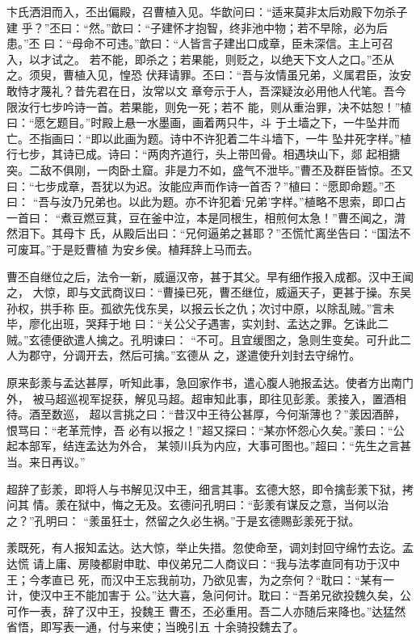 卞氏洒泪而入，丕出偏殿，召曹植入见。华歆问曰：“适来莫非太后劝殿下勿杀子建
乎？”丕曰：“然。”歆曰：“子建怀才抱智，终非池中物；若不早除，必为后患。”丕
曰：“母命不可违。”歆曰：“人皆言子建出口成章，臣未深信。主上可召入，以才试之。
若不能，即杀之；若果能，则贬之，以绝天下文人之口。”丕从之。须臾，曹植入见，惶恐
伏拜请罪。丕曰：“吾与汝情虽兄弟，义属君臣，汝安敢恃才蔑礼？昔先君在日，汝常以文
章夸示于人，吾深疑汝必用他人代笔。吾今限汝行七步吟诗一首。若果能，则免一死；若不
能，则从重治罪，决不姑恕！”植曰：“愿乞题目。”时殿上悬一水墨画，画着两只牛，斗
于土墙之下，一牛坠井而亡。丕指画曰：“即以此画为题。诗中不许犯着二牛斗墙下，一牛
坠井死字样。”植行七步，其诗已成。诗曰：“两肉齐道行，头上带凹骨。相遇块山下，郯
起相搪突。二敌不俱刚，一肉卧土窟。非是力不如，盛气不泄毕。”曹丕及群臣皆惊。丕又
曰：“七步成章，吾犹以为迟。汝能应声而作诗一首否？”植曰：“愿即命题。”丕曰：
“吾与汝乃兄弟也。以此为题。亦不许犯着‘兄弟’字样。”植略不思索，即口占一首曰：
“煮豆燃豆萁，豆在釜中泣，本是同根生，相煎何太急！”曹丕闻之，潸然泪下。其母卞
氏，从殿后出曰：“兄何逼弟之甚耶？”丕慌忙离坐告曰：“国法不可废耳。”于是贬曹植
为安乡侯。植拜辞上马而去。

曹丕自继位之后，法令一新，威逼汉帝，甚于其父。早有细作报入成都。汉中王闻之，
大惊，即与文武商议曰：“曹操已死，曹丕继位，威逼天子，更甚于操。东吴孙权，拱手称
臣。孤欲先伐东吴，以报云长之仇；次讨中原，以除乱贼。”言未毕，廖化出班，哭拜于地
曰：“关公父子遇害，实刘封、孟达之罪。乞诛此二贼。”玄德便欲遣人擒之。孔明谏曰：
“不可。且宜缓图之，急则生变矣。可升此二人为郡守，分调开去，然后可擒。”玄德从
之，遂遣使升刘封去守绵竹。

原来彭羕与孟达甚厚，听知此事，急回家作书，遣心腹人驰报孟达。使者方出南门外，
被马超巡视军捉获，解见马超。超审知此事，即往见彭羕。羕接入，置酒相待。酒至数巡，
超以言挑之曰：“昔汉中王待公甚厚，今何渐薄也？”羕因酒醉，恨骂曰：“老革荒悖，吾
必有以报之！”超又探曰：“某亦怀怨心久矣。”羕曰：“公起本部军，结连孟达为外合，
某领川兵为内应，大事可图也。”超曰：“先生之言甚当。来日再议。”

超辞了彭羕，即将人与书解见汉中王，细言其事。玄德大怒，即令擒彭羕下狱，拷问其
情。羕在狱中，悔之无及。玄德问孔明曰：“彭羕有谋反之意，当何以治之？”孔明曰：
“羕虽狂士，然留之久必生祸。”于是玄德赐彭羕死于狱。

羕既死，有人报知孟达。达大惊，举止失措。忽使命至，调刘封回守绵竹去讫。孟达慌
请上庸、房陵都尉申耽、申仪弟兄二人商议曰：“我与法孝直同有功于汉中王；今孝直已
死，而汉中王忘我前功，乃欲见害，为之奈何？“耽曰：“某有一计，使汉中王不能加害于
公。”达大喜，急问何计。耽曰：“吾弟兄欲投魏久矣，公可作一表，辞了汉中王，投魏王
曹丕，丕必重用。吾二人亦随后来降也。”达猛然省悟，即写表一通，付与来使；当晚引五
十余骑投魏去了。

